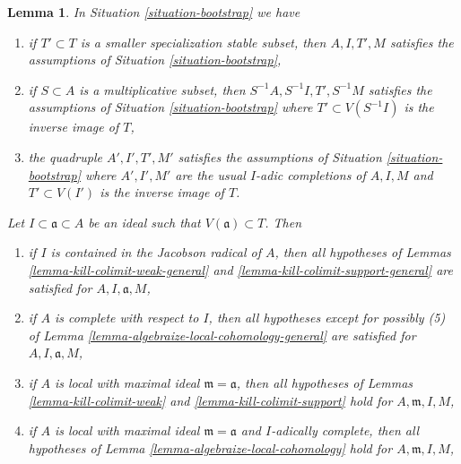 \documentclass{stacks-project}
\theoremstyle{plain}
\newtheorem{lemma}[subsection]{Lemma}
\theoremstyle{definition}
\theoremstyle{remark}
\numberwithin{equation}{subsection}
\begin{document}
\begin{lemma}
\label{lemma-bootstrap-inherited}
In Situation \ref{situation-bootstrap} we have
\begin{enumerate}
\item[(E)] if $T' \subset T$ is a smaller specialization stable subset, then
$A, I, T', M$ satisfies the assumptions of Situation \ref{situation-bootstrap},
\item[(F)] if $S \subset A$ is a multiplicative subset, then
$S^{-1}A, S^{-1}I, T', S^{-1}M$
satisfies the assumptions of Situation \ref{situation-bootstrap}
where $T' \subset V(S^{-1}I)$ is the inverse image of $T$,
\item[(G)] the quadruple $A', I', T', M'$
satisfies the assumptions of Situation \ref{situation-bootstrap}
where $A', I', M'$ are the usual $I$-adic completions of $A, I, M$
and $T' \subset V(I')$ is the inverse image of $T$.
\end{enumerate}
Let $I \subset \mathfrak a \subset A$ be an ideal such that
$V(\mathfrak a) \subset T$. Then
\begin{enumerate}
\item[(A)] if $I$ is contained in the Jacobson radical of $A$,
then all hypotheses of
Lemmas \ref{lemma-kill-colimit-weak-general} and
\ref{lemma-kill-colimit-support-general} are satisfied
for $A, I, \mathfrak a, M$,
\item[(B)] if $A$ is complete with respect to $I$, then
all hypotheses except for possibly (5) of
Lemma \ref{lemma-algebraize-local-cohomology-general}
are satisfied for $A, I, \mathfrak a, M$,
\item[(C)] if $A$ is local with maximal ideal $\mathfrak m = \mathfrak a$,
then all hypotheses of
Lemmas \ref{lemma-kill-colimit-weak} and \ref{lemma-kill-colimit-support}
hold for $A, \mathfrak m, I, M$,
\item[(D)] if $A$ is local with maximal ideal $\mathfrak m = \mathfrak a$
and $I$-adically complete, then all hypotheses of
Lemma \ref{lemma-algebraize-local-cohomology}
hold for $A, \mathfrak m, I, M$,
\end{enumerate}
\end{lemma}
\end{document}
